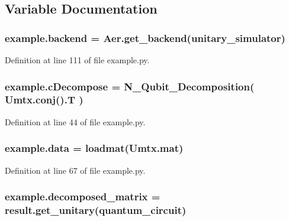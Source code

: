 \subsection{Variable Documentation}
\subsubsection[{\texorpdfstring{backend}{backend}}]{\setlength{\rightskip}{0pt plus 5cm}example.\+backend = Aer.\+get\+\_\+backend(\textquotesingle{}unitary\+\_\+simulator\textquotesingle{})}\hypertarget{namespaceexample_a6b87ddad36fca2722dc5fd955536f578}{}\label{namespaceexample_a6b87ddad36fca2722dc5fd955536f578}


Definition at line 111 of file example.\+py.

\subsubsection[{\texorpdfstring{c\+Decompose}{cDecompose}}]{\setlength{\rightskip}{0pt plus 5cm}example.\+c\+Decompose = {\bf N\+\_\+\+Qubit\+\_\+\+Decomposition}( Umtx.\+conj().T )}\hypertarget{namespaceexample_a0a2e936f47382b2bd8c9432ca77c6026}{}\label{namespaceexample_a0a2e936f47382b2bd8c9432ca77c6026}


Definition at line 44 of file example.\+py.

\subsubsection[{\texorpdfstring{data}{data}}]{\setlength{\rightskip}{0pt plus 5cm}example.\+data = loadmat(\textquotesingle{}Umtx.\+mat\textquotesingle{})}\hypertarget{namespaceexample_a9b062b4feb0fe50b0056ed5abb65681c}{}\label{namespaceexample_a9b062b4feb0fe50b0056ed5abb65681c}


Definition at line 67 of file example.\+py.

\subsubsection[{\texorpdfstring{decomposed\+\_\+matrix}{decomposed_matrix}}]{\setlength{\rightskip}{0pt plus 5cm}example.\+decomposed\+\_\+matrix = result.\+get\+\_\+unitary({\bf quantum\+\_\+circuit})}\hypertarget{namespaceexample_a4373e9d1485c7c940b9360eb187bca34}{}\label{namespaceexample_a4373e9d1485c7c940b9360eb187bca34}


